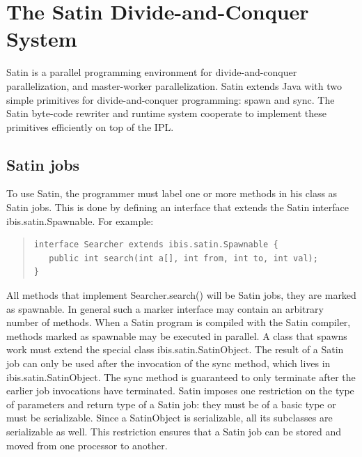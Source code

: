 \documentclass[10pt]{article}
\newcommand{\mysection}[1]{\section{#1}\label{#1}}
\newcommand{\mysubsection}[1]{\subsection{#1}\label{#1}}
\begin{document}
\mysection{The Satin Divide-and-Conquer System}

Satin is a parallel programming environment for divide-and-conquer
parallelization, and master-worker parallelization. Satin extends Java
with two simple primitives for divide-and-conquer programming: spawn
and sync. The Satin byte-code rewriter and runtime system cooperate to
implement these primitives efficiently on top of the IPL.  


\mysubsection{Satin jobs}

To use Satin, the programmer must label one or more methods in his
class as Satin jobs. This is done by defining an interface that
extends the Satin interface ibis.satin.Spawnable. For example:

\begin{quote}
\begin{verbatim}
interface Searcher extends ibis.satin.Spawnable {
   public int search(int a[], int from, int to, int val);
}
\end{verbatim}
\end{quote}
\noindent

All methods that implement Searcher.search() will be Satin jobs, they
are marked as spawnable.  In general such a marker interface may
contain an arbitrary number of methods.  When a Satin program is
compiled with the Satin compiler, methods marked as spawnable may be
executed in parallel. A class that spawns work must extend the special
class ibis.satin.SatinObject.  The result of a Satin job can only be
used after the invocation of the sync method, which lives in
ibis.satin.SatinObject. The sync method is guaranteed to only
terminate after the earlier job invocations have terminated.  Satin
imposes one restriction on the type of parameters and return type of a
Satin job: they must be of a basic type or must be serializable.
Since a SatinObject is serializable, all its subclasses are
serializable as well. This restriction ensures that a Satin job can be
stored and moved from one processor to another.
\end{document}
